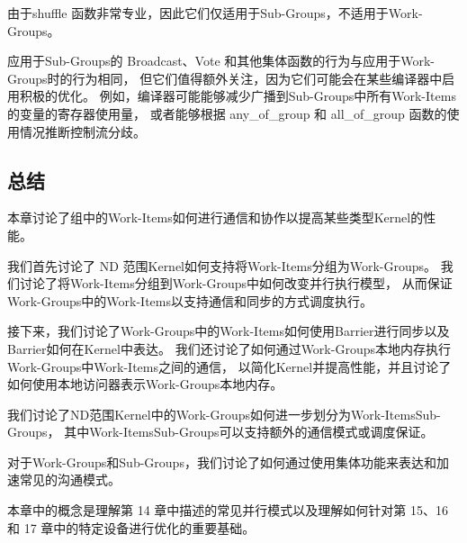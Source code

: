 由于shuffle 函数非常专业，因此它们仅适用于Sub-Groups，不适用于Work-Groups。

\begin{remark}
应用于Sub-Groups的 Broadcast、Vote 和其他集体函数的行为与应用于Work-Groups时的行为相同，
但它们值得额外关注，因为它们可能会在某些编译器中启用积极的优化。
例如，编译器可能能够减少广播到Sub-Groups中所有Work-Items的变量的寄存器使用量，
或者能够根据 any\_of\_group 和 all\_of\_group 函数的使用情况推断控制流分歧。
\end{remark}

\subsection{总结}
本章讨论了组中的Work-Items如何进行通信和协作以提高某些类型Kernel的性能。

我们首先讨论了 ND 范围Kernel如何支持将Work-Items分组为Work-Groups。 
我们讨论了将Work-Items分组到Work-Groups中如何改变并行执行模型，
从而保证Work-Groups中的Work-Items以支持通信和同步的方式调度执行。

接下来，我们讨论了Work-Groups中的Work-Items如何使用Barrier进行同步以及Barrier如何在Kernel中表达。 
我们还讨论了如何通过Work-Groups本地内存执行Work-Groups中Work-Items之间的通信，
以简化Kernel并提高性能，并且讨论了如何使用本地访问器表示Work-Groups本地内存。

我们讨论了ND范围Kernel中的Work-Groups如何进一步划分为Work-ItemsSub-Groups，
其中Work-ItemsSub-Groups可以支持额外的通信模式或调度保证。

对于Work-Groups和Sub-Groups，我们讨论了如何通过使用集体功能来表达和加速常见的沟通模式。

本章中的概念是理解第 14 章中描述的常见并行模式以及理解如何针对第 15、16 和 17 章中的特定设备进行优化的重要基础。